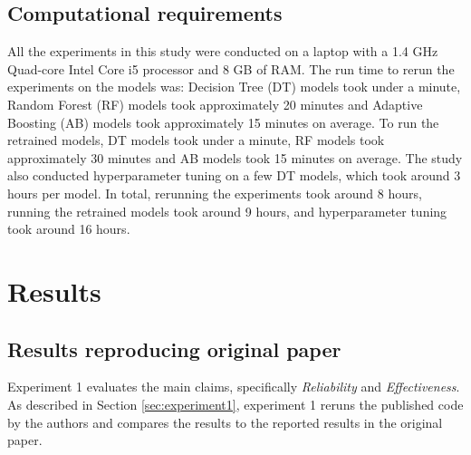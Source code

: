 \subsection{Computational requirements}
All the experiments in this study were conducted on a laptop with a 1.4 GHz Quad-core Intel Core i5 processor and 8 GB of RAM. The run time to rerun the experiments on the models was: Decision Tree (DT) models took under a minute, Random Forest (RF) models took approximately 20 minutes and Adaptive Boosting (AB) models took approximately 15 minutes on average. To run the retrained models, DT models took under a minute, RF models took approximately 30 minutes and AB models took 15 minutes on average. The study also conducted hyperparameter tuning on a few DT models, which took around 3 hours per model. In total, rerunning the experiments took around 8 hours, running the retrained models took around 9 hours, and hyperparameter tuning took around 16 hours.

\section{Results}
\label{sec:results}


\subsection{Results reproducing original paper}


Experiment 1 evaluates the main claims, specifically \textit{Reliability} and \textit{Effectiveness}. As described in Section \ref{sec:experiment1}, experiment 1 reruns the published code by the authors and compares the results to the reported results in the original paper.

